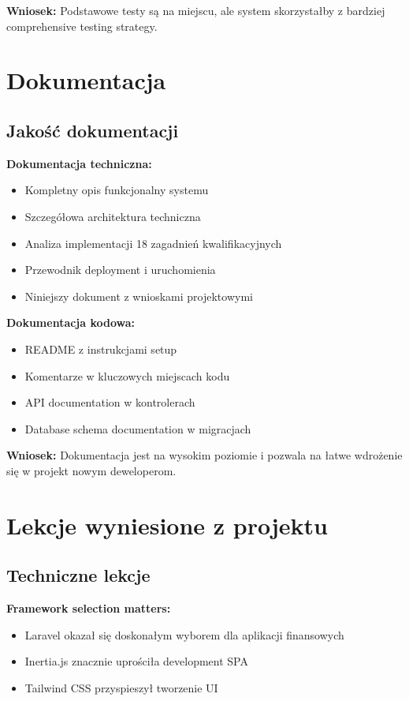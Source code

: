 \documentclass[12pt,a4paper]{article}
\begin{document}
    \textbf{Wniosek:} Podstawowe testy są na miejscu, ale system skorzystałby z bardziej comprehensive testing strategy.

    \section{Dokumentacja}

    \subsection{Jakość dokumentacji}

    \textbf{Dokumentacja techniczna:}
    \begin{itemize}
        \item Kompletny opis funkcjonalny systemu
        \item Szczegółowa architektura techniczna
        \item Analiza implementacji 18 zagadnień kwalifikacyjnych
        \item Przewodnik deployment i uruchomienia
        \item Niniejszy dokument z wnioskami projektowymi
    \end{itemize}

    \textbf{Dokumentacja kodowa:}
    \begin{itemize}
        \item README z instrukcjami setup
        \item Komentarze w kluczowych miejscach kodu
        \item API documentation w kontrolerach
        \item Database schema documentation w migracjach
    \end{itemize}

    \textbf{Wniosek:} Dokumentacja jest na wysokim poziomie i pozwala na łatwe wdrożenie się w projekt nowym deweloperom.

    \section{Lekcje wyniesione z projektu}

    \subsection{Techniczne lekcje}

    \textbf{Framework selection matters:}
    \begin{itemize}
        \item Laravel okazał się doskonałym wyborem dla aplikacji finansowych
        \item Inertia.js znacznie uprościła development SPA
        \item Tailwind CSS przyspieszył tworzenie UI
    \end{itemize}
\end{document}
